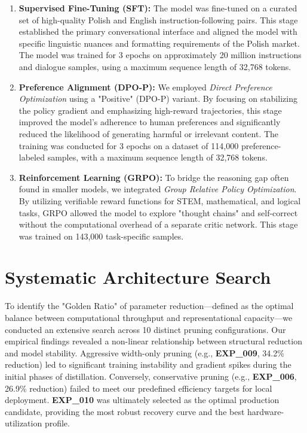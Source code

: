 \documentclass{article}
\begin{document}
\begin{enumerate}
    \item \textbf{Supervised Fine-Tuning (SFT):} The model was fine-tuned on a curated set of high-quality Polish and English instruction-following pairs. This stage established the primary conversational interface and aligned the model with specific linguistic nuances and formatting requirements of the Polish market. The model was trained for 3 epochs on approximately 20 million instructions and dialogue samples, using a maximum sequence length of 32{,}768 tokens.
    
    \item \textbf{Preference Alignment (DPO-P)\cite{pal2024smaugfixingfailuremodes}:} We employed \emph{Direct Preference Optimization} using a "Positive" (DPO-P) variant. By focusing on stabilizing the policy gradient and emphasizing high-reward trajectories, this stage improved the model's adherence to human preferences and significantly reduced the likelihood of generating harmful or irrelevant content. The training was conducted for 3 epochs on a dataset of 114{,}000 preference-labeled samples, with a maximum sequence length of 32{,}768 tokens.
    
    \item \textbf{Reinforcement Learning (GRPO)\cite{shao2024deepseek}:} To bridge the reasoning gap often found in smaller models, we integrated \emph{Group Relative Policy Optimization}. By utilizing verifiable reward functions for STEM, mathematical, and logical tasks, GRPO allowed the model to explore "thought chains" and self-correct without the computational overhead of a separate critic network. This stage was trained on 143{,}000 task-specific samples.
\end{enumerate}

\section{Systematic Architecture Search}
To identify the "Golden Ratio" of parameter reduction—defined as the optimal balance between computational throughput and representational capacity—we conducted an extensive search across 10 distinct pruning configurations. Our empirical findings revealed a non-linear relationship between structural reduction and model stability. Aggressive width-only pruning (e.g., \textbf{EXP\_009}, 34.2\% reduction) led to significant training instability and gradient spikes during the initial phases of distillation. Conversely, conservative pruning (e.g., \textbf{EXP\_006}, 26.9\% reduction) failed to meet our predefined efficiency targets for local deployment. \textbf{EXP\_010} was ultimately selected as the optimal production candidate, providing the most robust recovery curve and the best hardware-utilization profile.
\end{document}
